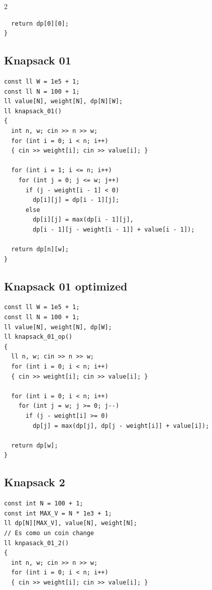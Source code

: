 \documentclass[twoside]{article}
\begin{document}
\begin{multicols*}{2}
\begin{verbatim}
  return dp[0][0]; 
}

\end{verbatim}

	{
		\subsection*{Knapsack 01}
	}
	\begin{verbatim}
const ll W = 1e5 + 1;
const ll N = 100 + 1;
ll value[N], weight[N], dp[N][W];
ll knapsack_01()
{
  int n, w; cin >> n >> w;
  for (int i = 0; i < n; i++)
  { cin >> weight[i]; cin >> value[i]; }

  for (int i = 1; i <= n; i++)
    for (int j = 0; j <= w; j++)
      if (j - weight[i - 1] < 0) 
        dp[i][j] = dp[i - 1][j];
      else 
        dp[i][j] = max(dp[i - 1][j], 
        dp[i - 1][j - weight[i - 1]] + value[i - 1]);
    
  return dp[n][w];
}

\end{verbatim}

	{
		\subsection*{Knapsack 01 optimized}
	}
	\begin{verbatim}
const ll W = 1e5 + 1;
const ll N = 100 + 1;
ll value[N], weight[N], dp[W];
ll knapsack_01_op()
{
  ll n, w; cin >> n >> w;
  for (int i = 0; i < n; i++)
  { cin >> weight[i]; cin >> value[i]; }

  for (int i = 0; i < n; i++)
    for (int j = w; j >= 0; j--)
      if (j - weight[i] >= 0)
        dp[j] = max(dp[j], dp[j - weight[i]] + value[i]);
      
  return dp[w];
}

\end{verbatim}

	{
		\subsection*{Knapsack 2}
	}
	\begin{verbatim}
const int N = 100 + 1;
const int MAX_V = N * 1e3 + 1;
ll dp[N][MAX_V], value[N], weight[N];
// Es como un coin change 
ll knpasack_01_2()
{
  int n, w; cin >> n >> w;
  for (int i = 0; i < n; i++)
  { cin >> weight[i]; cin >> value[i]; }


\end{verbatim}
\end{multicols*}
\end{document}
